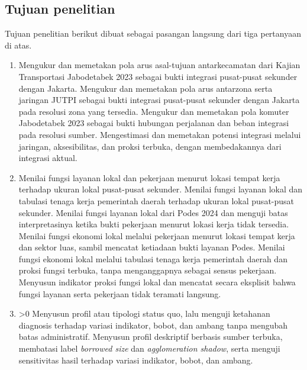 \documentclass[11pt]{article}
\newcounter{available}
\begin{document}
{{{{{{            \subsection*{Tujuan penelitian}
            Tujuan penelitian berikut dibuat sebagai pasangan langsung dari tiga pertanyaan di atas.
            \begin{enumerate}
              \item
              \ifnum{}
                Mengukur dan memetakan pola arus asal-tujuan antarkecamatan dari Kajian Transportasi Jabodetabek 2023 sebagai bukti integrasi pusat-pusat sekunder dengan Jakarta.
              \else
                \ifnum{}
                  Mengukur dan memetakan pola arus antarzona serta jaringan JUTPI sebagai bukti integrasi pusat-pusat sekunder dengan Jakarta pada resolusi zona yang tersedia.
                \else
                  \ifnum{}
                    Mengukur dan memetakan pola komuter Jabodetabek 2023 sebagai bukti hubungan perjalanan dan beban integrasi pada resolusi sumber.
                  \else
                    Mengestimasi dan memetakan potensi integrasi melalui jaringan, aksesibilitas, dan proksi terbuka, dengan membedakannya dari integrasi aktual.
                  \fi
                \fi
              \fi
              \item
              \ifnum{}
                \ifnum{}
                  Menilai fungsi layanan lokal dan pekerjaan menurut lokasi tempat kerja terhadap ukuran lokal pusat-pusat sekunder.
                \else
                  \ifnum{}
                    Menilai fungsi layanan lokal dan tabulasi tenaga kerja pemerintah daerah terhadap ukuran lokal pusat-pusat sekunder.
                  \else
                    Menilai fungsi layanan lokal dari Podes 2024 dan menguji batas interpretasinya ketika bukti pekerjaan menurut lokasi kerja tidak tersedia.
                  \fi
                \fi
              \else
                \ifnum{}
                  Menilai fungsi ekonomi lokal melalui pekerjaan menurut lokasi tempat kerja dan sektor luas, sambil mencatat ketiadaan bukti layanan Podes.
                \else
                  \ifnum{}
                    Menilai fungsi ekonomi lokal melalui tabulasi tenaga kerja pemerintah daerah dan proksi fungsi terbuka, tanpa menganggapnya sebagai sensus pekerjaan.
                  \else
                    Menyusun indikator proksi fungsi lokal dan mencatat secara eksplisit bahwa fungsi layanan serta pekerjaan tidak teramati langsung.
                  \fi
                \fi
              \fi
              \item
              \ifnum\value{available}>0
                Menyusun profil atau tipologi status quo, lalu menguji ketahanan diagnosis terhadap variasi indikator, bobot, dan ambang tanpa mengubah batas administratif.
              \else
                Menyusun profil deskriptif berbasis sumber terbuka, membatasi label \textit{borrowed size} dan \textit{agglomeration shadow}, serta menguji sensitivitas hasil terhadap variasi indikator, bobot, dan ambang.
              \fi
            \end{enumerate}

}}}}}}
\end{document}
